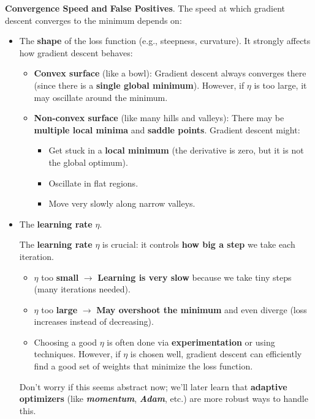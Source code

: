 \noindent
\textcolor{Green3}{\faIcon{\speedIcon} \textbf{Convergence Speed}} \textbf{and} \textcolor{Red2}{ \textbf{False Positives}}. The speed at which gradient descent converges to the minimum depends on:
\begin{itemize}
    \item The \textbf{shape} of the loss function (e.g., steepness, curvature). It strongly affects how gradient descent behaves:
    \begin{itemize}
        \item \textbf{Convex surface} (like a bowl): Gradient descent always converges there (since there is a \textbf{single global minimum}). However, if $\eta$ is too large, it may oscillate around the minimum.

        \item \textbf{Non-convex surface} (like many hills and valleys): There may be \textbf{multiple local minima} and \textbf{saddle points}. Gradient descent might: 
        \begin{itemize}
            \item[\textcolor{Red2}{\faIcon{exclamation-triangle}}] Get stuck in a \textbf{local minimum} (the derivative is zero, but it is not the global optimum).
            \item Oscillate in flat regions.
            \item Move very slowly along narrow valleys.
        \end{itemize}
    \end{itemize}


    \item The \textbf{learning rate} $\eta$.

    \textcolor{Green3}{} The \textbf{learning rate} $\eta$ is crucial: it controls \textbf{how big a step} we take each iteration.
    \begin{itemize}
        \item $\eta$ too \textbf{small} $\rightarrow$ \textbf{Learning is very slow} because we take tiny steps (many iterations needed).
        \item $\eta$ too \textbf{large} $\rightarrow$ \textbf{May overshoot the minimum} and even diverge (loss increases instead of decreasing).
        \item Choosing a good $\eta$ is often done via \textbf{experimentation} or using techniques. However, if $\eta$ is chosen well, gradient descent can efficiently find a good set of weights that minimize the loss function.
    \end{itemize}
    Don't worry if this seems abstract now; we'll later learn that \textbf{adaptive optimizers} (like \emph{\textbf{momentum}}, \emph{\textbf{Adam}}, etc.) are more robust ways to handle this.



\end{itemize}
